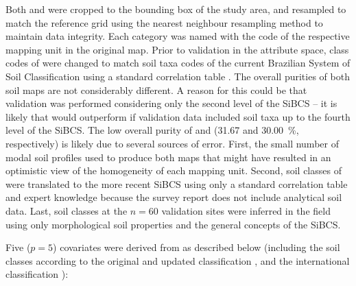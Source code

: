 Both \soilOld{} and \soilNew{} were cropped to the bounding box of the study area, and resampled to match the 
reference grid using the nearest neighbour resampling method to maintain data integrity. Each category was 
named with the code of the respective mapping unit in the original map. Prior to validation in the attribute 
space, class codes of \soilOld{} were changed to match soil 
taxa codes of the current Brazilian System of Soil Classification using a standard correlation table 
\cite{SantosEtAl2006}. The overall purities of both soil maps are not considerably different. A reason for this 
could be that validation was performed considering only 
the second level of the SiBCS -- it is likely that \soilNew{} would outperform \soilOld{} if validation data 
included soil taxa up to the fourth level of the SiBCS. The low overall purity of \soilOld{} and 
\soilNew{} (\num{31.67} and \SI{30.00}{\percent}, respectively) is likely due to several sources of error. 
First, the small number of modal soil profiles used to produce both maps that might have resulted in an 
optimistic view of the homogeneity of each mapping unit. Second, soil classes of \soilOld{} were translated to 
the more recent SiBCS using only a standard correlation table \cite{SantosEtAl2006} and expert knowledge 
because the survey report does not include analytical soil data. Last, soil classes at the $n = 60$ validation 
sites were inferred in the field using only morphological soil properties and the general concepts of the 
SiBCS.

Five ($p = 5$) covariates were derived from \soilOld{} as described below (including the soil classes according 
to the original and updated classification \cite{AzolinEtAl1988, SantosEtAl2013a}, and the international 
classification \cite{IUSSWorkingGroupWRB2007}):

